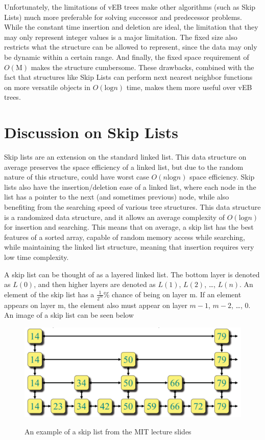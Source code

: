 \documentclass{article}
\begin{document}
Unfortunately, the limitations of vEB trees make other algorithms (such as Skip Lists) much more preferable for solving successor and predecessor problems. While the constant time insertion and deletion are ideal, the limitation that they may only represent integer values is a major limitation. The fixed size also restricts what the structure can be allowed to represent, since the data may only be dynamic within a certain range. And finally, the fixed space requirement of $O(\text{M})$ makes the structure cumbersome. These drawbacks, combined with the fact that structures like Skip Lists can perform next nearest neighbor functions on more versatile objects in $O(\text{log} n)$ time, makes them more useful over vEB trees.

\pagebreak

\section*{Discussion on Skip Lists}

Skip lists are an extension on the standard linked list. This data structure on average preserves the space efficiency of a linked list, but due to the random nature of this structure, could have worst case $O(n \text{log} n)$ space efficiency. Skip lists also have the insertion/deletion ease of a linked list, where each node in the list has a pointer to the next (and sometimes previous) node, while also benefiting from the searching speed of various tree structures. This data structure is a randomized data structure, and it allows an average complexity of $O(\text{log} n)$ for insertion and searching. This means that on average, a skip list has the best features of a sorted array, capable of random memory access while searching, while maintaining the linked list structure, meaning that insertion requires very low time complexity. 

A skip list can be thought of as a layered linked list. The bottom layer is denoted as $L(0)$, and then higher layers are denoted as $L(1)$, $L(2)$, \ldots, $L(n)$. An element of the skip list has a $\frac{1}{2^m}$\% chance of being on layer m. If an element appears on layer m, the element also must appear on layer $m-1$, $m-2$, \ldots, $0$. An image of a skip list can be seen below

\begin{figure}[h]
    \centering
    \includegraphics[width=\textwidth,keepaspectratio]{Images/SkipList_MIT.PNG}
    \label{fig:skip_list}
    \caption{An example of a skip list from the MIT lecture slides}
\end{figure}
\end{document}
